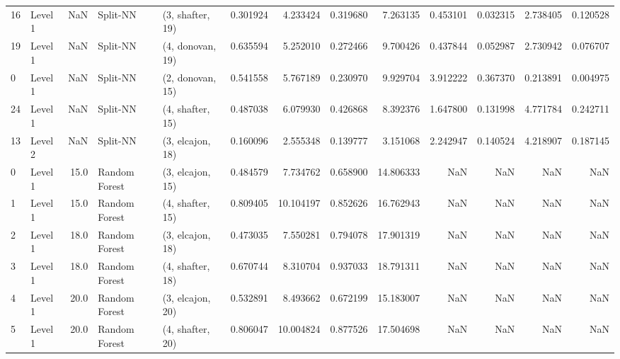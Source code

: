 \begin{tabular}{llrllrrrrrrrr}
16 &   Level 1 &    NaN &       Split-NN &  (3, shafter, 19) &   0.301924 &   4.233424 &  0.319680 &   7.263135 &             0.453101 &               0.032315 &            2.738405 &              0.120528 \\
19 &   Level 1 &    NaN &       Split-NN &  (4, donovan, 19) &   0.635594 &   5.252010 &  0.272466 &   9.700426 &             0.437844 &               0.052987 &            2.730942 &              0.076707 \\
0  &   Level 1 &    NaN &       Split-NN &  (2, donovan, 15) &   0.541558 &   5.767189 &  0.230970 &   9.929704 &             3.912222 &               0.367370 &            0.213891 &              0.004975 \\
24 &   Level 1 &    NaN &       Split-NN &  (4, shafter, 15) &   0.487038 &   6.079930 &  0.426868 &   8.392376 &             1.647800 &               0.131998 &            4.771784 &              0.242711 \\
13 &   Level 2 &    NaN &       Split-NN &  (3, elcajon, 18) &   0.160096 &   2.555348 &  0.139777 &   3.151068 &             2.242947 &               0.140524 &            4.218907 &              0.187145 \\
0  &   Level 1 &   15.0 &  Random Forest &  (3, elcajon, 15) &   0.484579 &   7.734762 &  0.658900 &  14.806333 &                  NaN &                    NaN &                 NaN &                   NaN \\
1  &   Level 1 &   15.0 &  Random Forest &  (4, shafter, 15) &   0.809405 &  10.104197 &  0.852626 &  16.762943 &                  NaN &                    NaN &                 NaN &                   NaN \\
2  &   Level 1 &   18.0 &  Random Forest &  (3, elcajon, 18) &   0.473035 &   7.550281 &  0.794078 &  17.901319 &                  NaN &                    NaN &                 NaN &                   NaN \\
3  &   Level 1 &   18.0 &  Random Forest &  (4, shafter, 18) &   0.670744 &   8.310704 &  0.937033 &  18.791311 &                  NaN &                    NaN &                 NaN &                   NaN \\
4  &   Level 1 &   20.0 &  Random Forest &  (3, elcajon, 20) &   0.532891 &   8.493662 &  0.672199 &  15.183007 &                  NaN &                    NaN &                 NaN &                   NaN \\
5  &   Level 1 &   20.0 &  Random Forest &  (4, shafter, 20) &   0.806047 &  10.004824 &  0.877526 &  17.504698 &                  NaN &                    NaN &                 NaN &                   NaN \\

\end{tabular}
